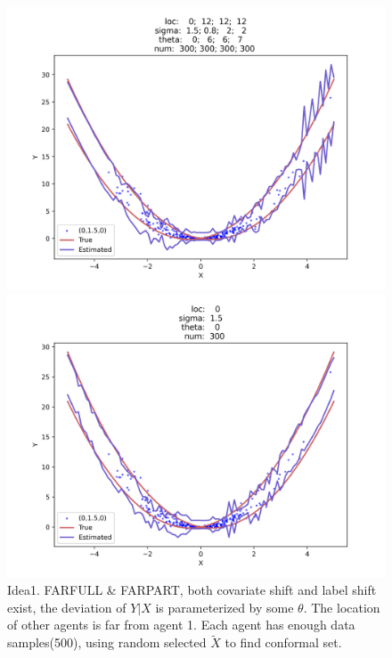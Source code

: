 \documentclass[12pt, a4paper, oneside]{article}
\begin{document}
    \begin{figure}[htbp]
        \centering
        \begin{minipage}{0.495\linewidth}
            \centering
            \includegraphics[width=0.98\linewidth]{fig/Ex1_2/FARFULL.png}
        \end{minipage}
        \begin{minipage}{0.495\linewidth}
            \centering
            \includegraphics[width=0.98\linewidth]{fig/Ex1_2/FARPART.png}
        \end{minipage}
        \caption{Idea1. FARFULL \& FARPART, both covariate shift and label shift exist, the deviation of $Y|X$ is parameterized by some $\theta$. The location of other agents is far from agent 1. Each agent has enough data samples(500), using random selected $\tilde{X}$ to find conformal set.}
        \label{Fig7}
    \end{figure}
\end{document}
